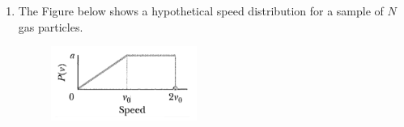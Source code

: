 \documentclass{zc-ust-hw}
\begin{document}
\maketitle

\begin{enumerate}
  \item The Figure below shows a hypothetical speed distribution for a sample
    of $N$ gas particles.
    \begin{figure}[htpb]
      \begin{center}
        \includegraphics[width=0.45\textwidth]{figures/1705953512.png}
      \end{center}
      \caption{}
    \end{figure}
    

\end{enumerate}
\end{document}
